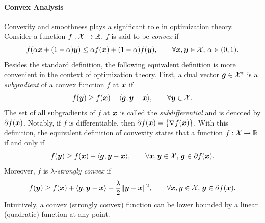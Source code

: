 \paragraph{Convex Analysis}
Convexity and smoothness plays a significant role in optimization theory. Consider a function $f:{\cal X}\to\mathbb R$. $f$ is said to be \emph{convex} if 
\begin{equation}
    f(\alpha {\boldsymbol{x}} + (1-\alpha){\boldsymbol{y}}) \le \alpha f({\boldsymbol{x}}) + (1-\alpha) f({\boldsymbol{y}}), \qquad \forall {\boldsymbol{x}},{\boldsymbol{y}}\in{\cal X}, \, \alpha\in(0,1).
    \label{eqn:ch1:convex-defn}
\end{equation}
Besides the standard definition, the following equivalent definition is more convenient in the context of optimization theory. First, a dual vector ${\boldsymbol{g}}\in{\cal X}^*$ is a \emph{subgradient} of a convex function $f$ at ${\boldsymbol{x}}$ if
\begin{equation}
    f({\boldsymbol{y}}) \ge f({\boldsymbol{x}}) + \langle {\boldsymbol{g}}, {\boldsymbol{y}}-{\boldsymbol{x}}\rangle, \qquad \forall {\boldsymbol{y}}\in{\cal X}.
    \label{eqn:ch1:subgradient}
\end{equation}
The set of all subgradients of $f$ at ${\boldsymbol{x}}$ is called the \emph{subdifferential} and is denoted by $\partial f({\boldsymbol{x}})$. Notably, if $f$ is differentiable, then $\partial f({\boldsymbol{x}}) = \{\nabla f({\boldsymbol{x}})\}$.
With this definition, the equivalent definition of convexity states  that a function $f:{\cal X}\to\mathbb R$ if and only if
\begin{equation}
    f({\boldsymbol{y}}) \ge f({\boldsymbol{x}}) + \langle {\boldsymbol{g}}, {\boldsymbol{y}}-{\boldsymbol{x}}\rangle, \qquad \forall {\boldsymbol{x}},{\boldsymbol{y}}\in{\cal X},\, {\boldsymbol{g}} \in \partial f({\boldsymbol{x}}).
    \label{eqn:ch1:convexity}
\end{equation}
Moreover, $f$ is \emph{$\lambda$-strongly convex} if 
\begin{equation}
    f({\boldsymbol{y}}) \ge f({\boldsymbol{x}}) + \langle {\boldsymbol{g}}, {\boldsymbol{y}}-{\boldsymbol{x}}\rangle + \frac{\lambda}{2}\|{\boldsymbol{y}}-{\boldsymbol{x}}\|^2, \qquad \forall {\boldsymbol{x}},{\boldsymbol{y}}\in{\cal X},\, {\boldsymbol{g}} \in \partial f({\boldsymbol{x}}).
    \label{eqn:ch1:strong-convexity}
\end{equation}
Intuitively, a convex (strongly convex) function can be lower bounded by a linear (quadratic) function at any point.

